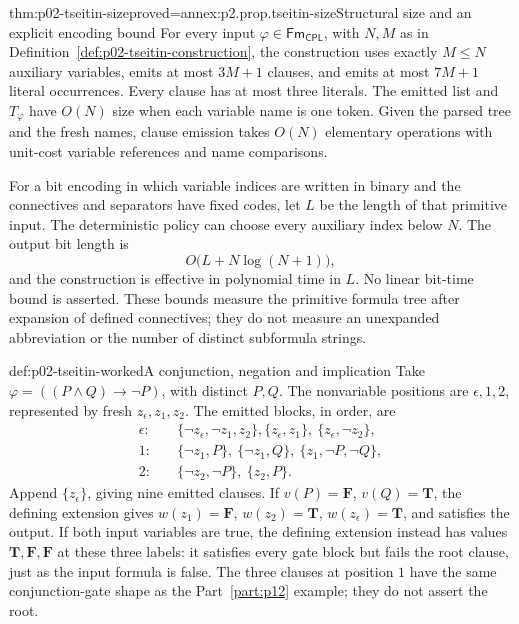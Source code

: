 \begin{hbtheorem}{thm:p02-tseitin-size}{proved=annex:p2.prop.tseitin-size}{Structural size and an explicit encoding bound}
For every input \(\varphi\in\mathsf{Fm}_{\mathsf{CPL}}\), with \(N,M\) as in
Definition~\ref{def:p02-tseitin-construction},
the construction uses exactly \(M\leq N\) auxiliary variables, emits at most
\(3M+1\) clauses, and emits at most \(7M+1\) literal occurrences.  Every
clause has at most three literals.  The emitted list and \(T_\varphi\) have
\(O(N)\) size when each variable name is one token.  Given the parsed tree
and the fresh names, clause emission takes \(O(N)\) elementary operations
with unit-cost variable references and name comparisons.

For a bit encoding in which variable indices are written in binary and the
connectives and separators have fixed codes, let \(L\) be the length of that
primitive input.
The deterministic policy can choose every auxiliary index below \(N\).
The output bit length is
\[
 O\bigl(L+N\log(N+1)\bigr),
\]
and the construction is effective in polynomial time in \(L\).
No linear bit-time bound is asserted.  These bounds measure the primitive
formula tree after expansion of defined connectives; they do not measure an
unexpanded abbreviation or the number of distinct subformula strings.
\end{hbtheorem}

\begin{hbexample}{def:p02-tseitin-worked}{A conjunction, negation and implication}
Take \(\varphi=((P\land Q)\to\neg P)\), with distinct \(P,Q\).
The nonvariable positions are \(\epsilon,1,2\), represented by fresh
\(z_\epsilon,z_1,z_2\).  The emitted blocks, in order, are
\[
\begin{aligned}
 \epsilon:&\quad
  \{\neg z_\epsilon,\neg z_1,z_2\},
  \{z_\epsilon,z_1\},\ \{z_\epsilon,\neg z_2\},\\
 1:&\quad
  \{\neg z_1,P\},\ \{\neg z_1,Q\},\ \{z_1,\neg P,\neg Q\},\\
 2:&\quad \{\neg z_2,\neg P\},\ \{z_2,P\}.
\end{aligned}
\]
Append \(\{z_\epsilon\}\), giving nine emitted clauses.
If \(v(P)=\mathbf{F}\), \(v(Q)=\mathbf{T}\), the defining extension gives
\(w(z_1)=\mathbf{F}\), \(w(z_2)=\mathbf{T}\), \(w(z_\epsilon)=\mathbf{T}\),
and satisfies the output.  If both input variables are true, the defining
extension instead has values \(\mathbf{T},\mathbf{F},\mathbf{F}\) at these three
labels: it satisfies every gate block but fails the root clause, just as the
input formula is false.  The three clauses at position \(1\) have the same
conjunction-gate shape as the Part~\ref{part:p12} example; they do not assert the root.
\end{hbexample}

